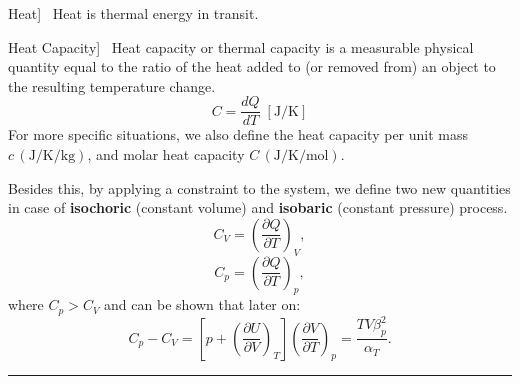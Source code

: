 \documentclass[UTF8]{book}
\newenvironment{theorem}[2][Theorem]{\begin{trivlist}
\item[\hskip \labelsep {\bfseries #1}\hskip \labelsep {\bfseries }]}{\end{trivlist}}
\begin{document}
\begin{theorem}
[Heat]~  {Heat is thermal energy in transit.}
\end{theorem}
\begin{theorem}
[Heat Capacity]~  {Heat capacity or thermal capacity is a measurable physical quantity equal to the ratio of the heat added to (or removed from) an object to the resulting temperature change.}
\[\boxed{C=\frac{dQ}{dT} \; [\si{\joule\per\kelvin}]}\]
 {For more specific situations, we also define the heat capacity per unit mass $c\,(\si{\joule\per\kelvin\per\kilo\gram})$, and molar heat capacity $C\,(\si{\joule\per\kelvin\per\mole})$}.

{Besides this, by applying a constraint to the system, we define two new quantities in case of \textbf{isochoric} (constant volume) and \textbf{isobaric} (constant pressure) process.}
$$C_V=\left(\dfrac{\partial Q}{\partial T}\right)_V,$$
$$C_p=\left(\dfrac{\partial Q}{\partial T}\right)_p,$$
{where }$C_p > C_V$ { and can be shown that later on:}
\begin{equation}\label{heat capacity}
C_p-C_V=\left[p+\left(\dfrac{\partial U}{\partial V}\right)_T\right]\left(\dfrac{\partial V}{\partial T}\right)_p=\dfrac{TV\beta _p^2}{\alpha _T }.
\end{equation}
\end{theorem}
\rule{\textwidth}{1pt}
\end{document}
